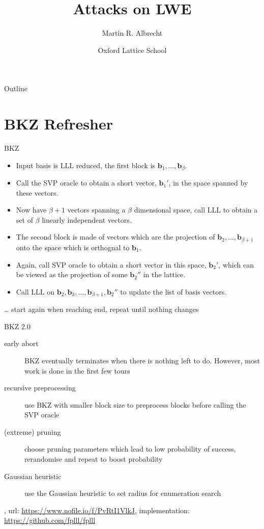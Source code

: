 \documentclass[presentation,smaller]{beamer}
\author{Martin R. Albrecht}
\date{Oxford Lattice School}
\title{Attacks on LWE}
\renewcommand{\vec}[1]{\mathbf{#1}\xspace}
\begin{document}
\maketitle
\begin{frame}{Outline}
\tableofcontents
\end{frame}


\section{BKZ Refresher}
\label{sec:orgf875599}
\begin{frame}[label={sec:org9ac4ce5}]{BKZ}
\begin{itemize}
\item Input basis is LLL reduced, the \alert{first block} is \(\vec{b}_1,\dots,\vec{b}_{β}\).
\item Call the SVP oracle to obtain a short vector, \(\vec{b}_1'\), in the space spanned by these vectors.
\item Now have \(β+1\) vectors spanning a \(β\) dimensional space, call LLL to obtain a set of \(β\) linearly independent vectors.
\item The \alert{second block} is made of vectors which are the projection of \(\vec{b}_2,\dots, \vec{b}_{β+1}\) onto the space which is orthognal to \(\vec{b}_1\).
\item Again, call SVP oracle to obtain a short vector in this space, \(\vec{b}_2'\), which can be viewed as the projection of some \(\vec{b}_2''\) in the lattice.
\item Call LLL on \(\vec{b}_2, \vec{b}_3,\dots, \vec{b}_{β+1}, \vec{b}_2''\) to update the list of basis vectors.
\end{itemize}

… start again when reaching end, repeat until nothing changes
\end{frame}

\begin{frame}[label={sec:org3b0d7c6}]{BKZ 2.0}
\begin{description}
\item[{early abort}] BKZ eventually terminates when there is nothing left to do. However, most work is done in the first few tours
\item[{recursive preprocessing}] use BKZ with smaller block size to preprocess blocks before calling the SVP oracle
\item[{(extreme) pruning}] choose pruning parameters which lead to low probability of success, rerandomise and repeat to boost probability
\item[{Gaussian heuristic}] use the Gaussian heuristic to set radius for enumeration search
\end{description}

\begin{block}{}
,
url: \url{https://www.nofile.io/f/PvRtI1VlkJ},
implementation: \url{https://github.com/fplll/fplll}
\end{block}
\end{frame}
\end{document}
